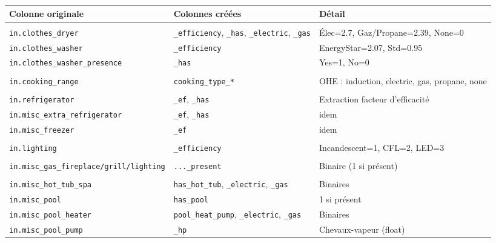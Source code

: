 \documentclass[11pt,a4paper]{article}
\begin{document}
\begin{longtable}{L{4.0cm}L{4.2cm}L{5.8cm}}
\toprule
\textbf{Colonne originale} & \textbf{Colonnes créées} & \textbf{Détail} \\
\midrule
\endhead

 \\
\texttt{in.clothes\_dryer}
  & \texttt{\_efficiency}, \texttt{\_has}, \texttt{\_electric}, \texttt{\_gas}
  & Élec=2.7, Gaz/Propane=2.39, None=0 \\
\texttt{in.clothes\_washer}
  & \texttt{\_efficiency} & EnergyStar=2.07, Std=0.95 \\
\texttt{in.clothes\_washer\_presence} & \texttt{\_has} & Yes=1, No=0 \\

 \\
\texttt{in.cooking\_range}
  & \texttt{cooking\_type\_*}
  & OHE : induction, electric, gas, propane, none \\

 \\
\texttt{in.refrigerator}
  & \texttt{\_ef}, \texttt{\_has} & Extraction facteur d'efficacité \\
\texttt{in.misc\_extra\_refrigerator}
  & \texttt{\_ef}, \texttt{\_has} & idem \\
\texttt{in.misc\_freezer} & \texttt{\_ef} & idem \\

 \\
\texttt{in.lighting}
  & \texttt{\_efficiency} & Incandescent=1, CFL=2, LED=3 \\

 \\
\texttt{in.misc\_gas\_fireplace/grill/lighting}
  & \texttt{...\_present} & Binaire (1 si présent) \\

 \\
\texttt{in.misc\_hot\_tub\_spa}
  & \texttt{has\_hot\_tub}, \texttt{\_electric}, \texttt{\_gas}
  & Binaires \\
\texttt{in.misc\_pool} & \texttt{has\_pool} & 1 si présent \\
\texttt{in.misc\_pool\_heater}
  & \texttt{pool\_heat\_pump}, \texttt{\_electric}, \texttt{\_gas}
  & Binaires \\
\texttt{in.misc\_pool\_pump} & \texttt{\_hp}
  & Chevaux-vapeur (float) \\


\end{longtable}
\end{document}
